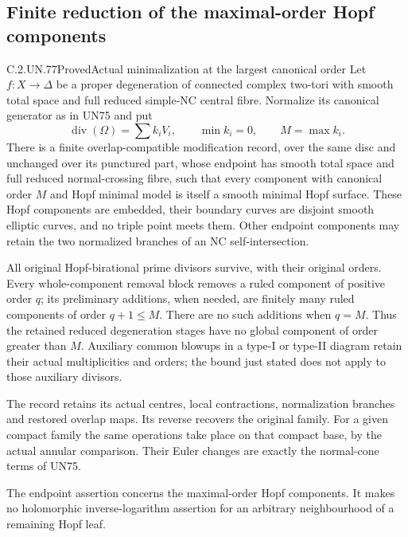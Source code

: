 \subsection{Finite reduction of the maximal-order Hopf components}

\begin{statement}{C.2.UN.77}{Proved}{Actual minimalization at the largest canonical order}
Let \(f:X\to\Delta\) be a proper degeneration of connected
complex two-tori with smooth total space and full reduced
simple-NC central fibre.  Normalize its canonical generator
as in UN75 and put
\[
        \operatorname{div}(\Omega)=\sum k_iV_i,\qquad
        \min k_i=0,\qquad M=\max k_i .
\tag{C.HM.1}
\]
There is a finite overlap-compatible modification record,
over the same disc and unchanged over its punctured part,
whose endpoint has smooth total space and full reduced
normal-crossing fibre, such that every component with
canonical order \(M\) and Hopf minimal model is itself a
smooth minimal Hopf surface.  These Hopf components are
embedded, their boundary curves are disjoint smooth
elliptic curves, and no triple point meets them.
Other endpoint components may retain the two normalized
branches of an NC self-intersection.

All original Hopf-birational prime divisors survive, with
their original orders.  Every whole-component removal block
removes a ruled component of positive order \(q\);
its preliminary additions, when needed, are finitely many
ruled components of order \(q+1\le M\).  There are no such
additions when \(q=M\).  Thus the retained reduced degeneration stages have
no global component of order greater than \(M\).
Auxiliary common blowups in a type-I or type-II diagram
retain their actual multiplicities and orders; the bound
just stated does not apply to those auxiliary divisors.

The record retains its actual centres, local contractions,
normalization branches and restored overlap maps.  Its
reverse recovers the original family.  For a given compact
family the same operations take place on that compact
base, by the actual annular comparison.  Their Euler
changes are exactly the normal-cone terms of UN75.

The endpoint assertion concerns the maximal-order Hopf
components.  It makes no holomorphic inverse-logarithm
assertion for an arbitrary neighbourhood of a remaining
Hopf leaf.
\end{statement}

